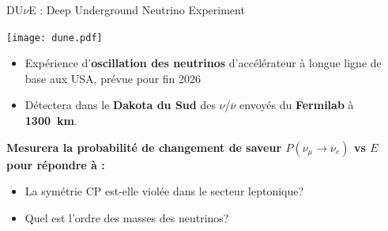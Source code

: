     \begin{frame}{DU$\nu$E : Deep Underground Neutrino Experiment}
        \begin{scriptsize}
            \centering
            \texttt{[image: dune.pdf]}\\
            \vspace{0.4cm}
            \begin{minipage}[t]{0.48\textwidth}
                \begin{itemize}
                    \item Expérience d'\textbf{oscillation des neutrinos} d'accélérateur à longue ligne de base aux USA, prévue pour fin 2026
                    \item Détectera dans le \textbf{Dakota du Sud} des $\nu$/$\overline{\nu}$ envoyés du \textbf{Fermilab} à \textbf{\SI{1300}{\kilo\meter}}.
                \end{itemize}
            \end{minipage}\hfill
             \begin{minipage}[t]{0.48\textwidth}
                \textbf{Mesurera la probabilité de changement de saveur $P(\nu_{\mu}\to\nu_e)$ vs $E$ pour répondre à : }
                \begin{itemize}
                    \item La symétrie CP est-elle violée dans le secteur leptonique?
                    \item Quel est l'ordre des masses des neutrinos?
                \end{itemize}
            \end{minipage}\vfill
        \end{scriptsize}
    \end{frame}
    
